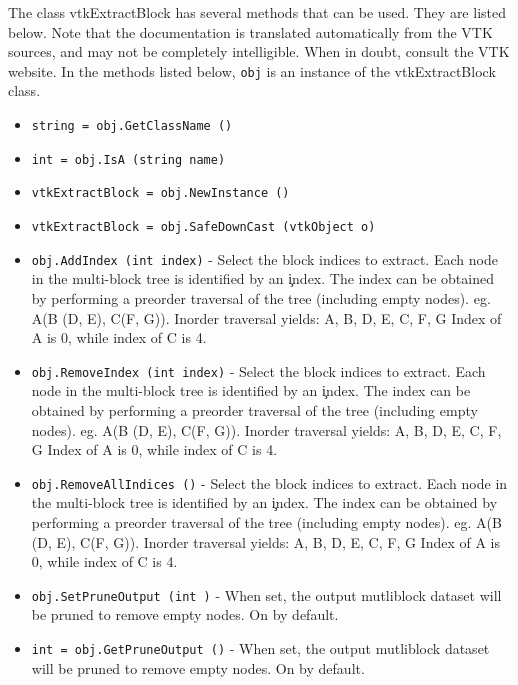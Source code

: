 The class vtkExtractBlock has several methods that can be used.
  They are listed below.
Note that the documentation is translated automatically from the VTK sources,
and may not be completely intelligible.  When in doubt, consult the VTK website.
In the methods listed below, \verb|obj| is an instance of the vtkExtractBlock class.
\begin{itemize}
\item  \verb|string = obj.GetClassName ()|

\item  \verb|int = obj.IsA (string name)|

\item  \verb|vtkExtractBlock = obj.NewInstance ()|

\item  \verb|vtkExtractBlock = obj.SafeDownCast (vtkObject o)|

\item  \verb|obj.AddIndex (int index)| -  Select the block indices to extract. 
 Each node in the multi-block tree is identified by an \c index. The index can
 be obtained by performing a preorder traversal of the tree (including empty 
 nodes). eg. A(B (D, E), C(F, G)). 
 Inorder traversal yields: A, B, D, E, C, F, G
 Index of A is 0, while index of C is 4.

\item  \verb|obj.RemoveIndex (int index)| -  Select the block indices to extract. 
 Each node in the multi-block tree is identified by an \c index. The index can
 be obtained by performing a preorder traversal of the tree (including empty 
 nodes). eg. A(B (D, E), C(F, G)). 
 Inorder traversal yields: A, B, D, E, C, F, G
 Index of A is 0, while index of C is 4.

\item  \verb|obj.RemoveAllIndices ()| -  Select the block indices to extract. 
 Each node in the multi-block tree is identified by an \c index. The index can
 be obtained by performing a preorder traversal of the tree (including empty 
 nodes). eg. A(B (D, E), C(F, G)). 
 Inorder traversal yields: A, B, D, E, C, F, G
 Index of A is 0, while index of C is 4.

\item  \verb|obj.SetPruneOutput (int )| -  When set, the output mutliblock dataset will be pruned to remove empty
 nodes. On by default.

\item  \verb|int = obj.GetPruneOutput ()| -  When set, the output mutliblock dataset will be pruned to remove empty
 nodes. On by default.


\end{itemize}
